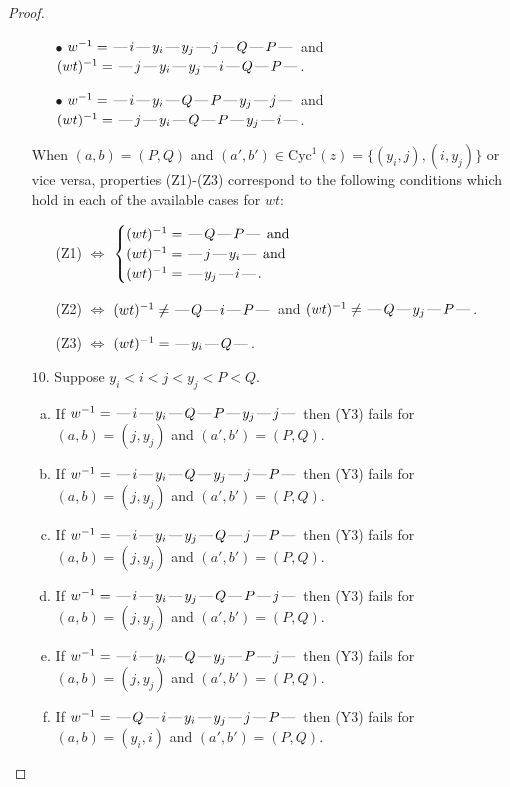 \documentclass[10pt]{article}
\theoremstyle{definition}
\theoremstyle{definition}
\def\dash{\text{\hspace{0.5mm}---\hspace{0.5mm}}}
\def\Cyc{\mathrm{Cyc}}
\begin{document}
\begin{proof}
\begin{enumerate}
\begin{enumerate}
\item[$\bullet$] $w^{-1} = \dash i\dash y_i\dash y_j\dash j\dash Q\dash P\dash $ and $(wt)^{-1} = \dash j\dash y_i\dash y_j\dash i\dash Q\dash P\dash $.
\item[$\bullet$] $w^{-1} = \dash i\dash y_i\dash Q\dash P\dash y_j\dash j\dash $ and $(wt)^{-1} = \dash j\dash y_i\dash Q\dash P\dash y_j\dash i\dash $.
\end{enumerate}
When $(a,b)= (P,Q)$ and $(a',b')\in \Cyc^1(z)=\{(y_i,j),(i,y_j)\}$ or vice versa,
properties (Z1)-(Z3) correspond to the following conditions which
hold in each of the available cases for $wt$:
\begin{enumerate}
\item[](Z1) $\Leftrightarrow$ $\begin{cases}\text{$(wt)^{-1} = \dash Q \dash P \dash$}\text{ and }\\
\text{$(wt)^{-1} = \dash j \dash y_i \dash$}\text{ and }\\
\text{$(wt)^{-1} = \dash y_j \dash i \dash$}.\end{cases}$
\item[](Z2) $\Leftrightarrow$ $(wt)^{-1} \neq \dash Q \dash i \dash P \dash$ and $(wt)^{-1}\neq \dash Q \dash y_j \dash P \dash$.
\item[](Z3) $\Leftrightarrow$ $(wt)^{-1} = \dash y_i \dash Q \dash$.
\end{enumerate}
\item[$10$.] Suppose $y_i < i < j < y_j < P < Q$.
\begin{enumerate}[(a)]
\item If $w^{-1} = \dash i\dash y_i\dash Q\dash P\dash y_j\dash j\dash $ then (Y3) fails for $(a,b)=(j,y_j)$ and $(a',b')=(P,Q)$.
\item If $w^{-1} = \dash i\dash y_i\dash Q\dash y_j\dash j\dash P\dash $ then (Y3) fails for $(a,b)=(j,y_j)$ and $(a',b')=(P,Q)$.
\item If $w^{-1} = \dash i\dash y_i\dash y_j\dash Q\dash j\dash P\dash $ then (Y3) fails for $(a,b)=(j,y_j)$ and $(a',b')=(P,Q)$.
\item If $w^{-1} = \dash i\dash y_i\dash y_j\dash Q\dash P\dash j\dash $ then (Y3) fails for $(a,b)=(j,y_j)$ and $(a',b')=(P,Q)$.
\item If $w^{-1} = \dash i\dash y_i\dash Q\dash y_j\dash P\dash j\dash $ then (Y3) fails for $(a,b)=(j,y_j)$ and $(a',b')=(P,Q)$.
\item If $w^{-1} = \dash Q\dash i\dash y_i\dash y_j\dash j\dash P\dash $ then (Y3) fails for $(a,b)=(y_i,i)$ and $(a',b')=(P,Q)$.

\end{enumerate}
\end{enumerate}
\end{proof}
\end{document}
